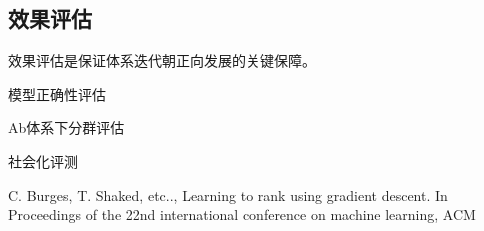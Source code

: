 \subsection{效果评估}
效果评估是保证体系迭代朝正向发展的关键保障。
\begin{description}
	\item 模型正确性评估
	\item Ab体系下分群评估
	\item 社会化评测
\end{description} 

\begin{thebibliography}{99}
 C. Burges, T. Shaked, etc.., Learning to rank 
using gradient descent. In Proceedings of the 22nd international 
conference on machine learning, ACM
\end{thebibliography}

 
